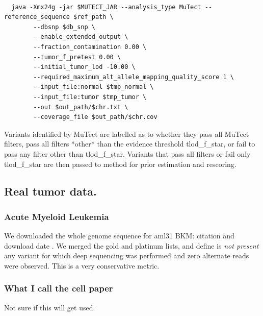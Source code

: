 \documentclass[a4,center,fleqn]{NAR}
\newcommand{\bkmcomment}[1]{{\color{blue}BKM: #1}}
\begin{document}
\begin{tiny}
\begin{verbatim}

  java -Xmx24g -jar $MUTECT_JAR --analysis_type MuTect --reference_sequence $ref_path \
        --dbsnp $db_snp \
        --enable_extended_output \
        --fraction_contamination 0.00 \
        --tumor_f_pretest 0.00 \
        --initial_tumor_lod -10.00 \
        --required_maximum_alt_allele_mapping_quality_score 1 \
        --input_file:normal $tmp_normal \
        --input_file:tumor $tmp_tumor \
        --out $out_path/$chr.txt \
        --coverage_file $out_path/$chr.cov

\end{verbatim}
\end{tiny}
Variants identified by MuTect are labelled as to whether they pass all MuTect filters, pass all filters *other* than the evidence threshold \textrm{tlod\_f\_star}, or fail to pass any filter other than \textrm{tlod\_f\_star}. Variants that pass all filters or fail only \textrm{tlod\_f\_star} are then passed to {method} for prior estimation and rescoring.

\subsection{Real tumor data.}
\subsubsection{Acute Myeloid Leukemia}
We downloaded the whole genome sequence for aml31 \bkmcomment{citation and download date} \cite{Griffith2015}.
We merged the gold and platinum lists, and define is \textit{not present} any variant for which deep sequencing was performed and zero alternate reads were observed.
This is a very conservative metric.
\subsubsection{What I call the cell paper} Not sure if this will get used.
\end{document}
